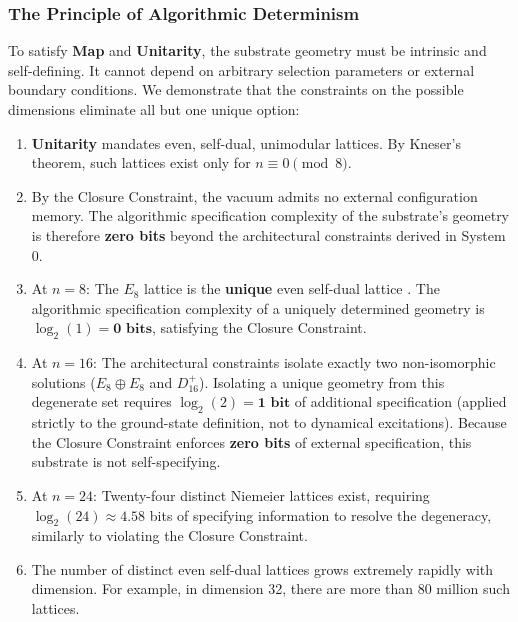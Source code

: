 \subsubsection{The Principle of Algorithmic Determinism}
\label{sec:principleofalgorithmicdeterminism}

To satisfy \textbf{Map} and \textbf{Unitarity}, the substrate geometry must be intrinsic and self-defining. It cannot depend on arbitrary selection parameters or external boundary conditions. We demonstrate that the constraints on the possible dimensions eliminate all but one unique option:

\begin{enumerate}
    \item \textbf{Unitarity} mandates even, self-dual, unimodular lattices. By Kneser's theorem, such lattices exist only for $n \equiv 0 \pmod{8}$.
    
    \item By the Closure Constraint, the vacuum admits no external configuration memory. The algorithmic specification complexity of the substrate's geometry is therefore \textbf{zero bits} beyond the architectural constraints derived in System 0.

    \item At $n = 8$: The $E_8$ lattice is the \textbf{unique} even self-dual lattice \cite{conway_sphere_1988}. The algorithmic specification complexity of a uniquely determined geometry is $\log_2(1) = \textbf{0 bits}$, satisfying the Closure Constraint.

    \item At $n = 16$: The architectural constraints isolate exactly two non-isomorphic solutions ($E_8 \oplus E_8$ and $D_{16}^+$). Isolating a unique geometry from this degenerate set requires $\log_2(2) = \textbf{1 bit}$ of additional specification (applied strictly to the ground-state definition, not to dynamical excitations). Because the Closure Constraint enforces \textbf{zero bits} of external specification, this substrate is not self-specifying.

    \item At $n = 24$: Twenty-four distinct Niemeier lattices exist, requiring $\log_2(24) \approx 4.58$ bits of specifying information to resolve the degeneracy, similarly to violating the Closure Constraint. 
    
    \item The number of distinct even self-dual lattices grows extremely rapidly with dimension. For example, in dimension 32, there are more than 80 million such lattices.
\end{enumerate}

